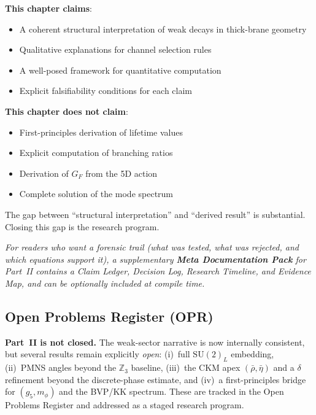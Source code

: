 \begin{tcolorbox}[readerContract, title={Final Epistemic Statement}]
\textbf{This chapter claims}:
\begin{itemize}[nosep]
  \item A coherent structural interpretation of weak decays in thick-brane geometry
  \item Qualitative explanations for channel selection rules
  \item A well-posed framework for quantitative computation
  \item Explicit falsifiability conditions for each claim
\end{itemize}

\textbf{This chapter does not claim}:
\begin{itemize}[nosep]
  \item First-principles derivation of lifetime values
  \item Explicit computation of branching ratios
  \item Derivation of $G_F$ from the 5D action
  \item Complete solution of the mode spectrum
\end{itemize}

The gap between ``structural interpretation'' and ``derived result'' is
substantial. Closing this gap is the research program.
\end{tcolorbox}

\vspace{0.5em}
\noindent\textit{For readers who want a forensic trail (what was tested, what was rejected,
and which equations support it), a supplementary \textbf{Meta Documentation Pack} for Part~II
contains a Claim Ledger, Decision Log, Research Timeline, and Evidence Map, and can be
optionally included at compile time.}

\subsection{Open Problems Register (OPR)}
\label{sec:opr}

\begin{tcolorbox}[breakable, enhanced, colback=yellow!4, colframe=yellow!60!black,
    title=\textbf{Open Status (Part II)}, width=\linewidth]
\textbf{Part~II is not closed.} The weak-sector narrative is now internally
consistent, but several results remain explicitly \emph{open}: (i)~full
$\mathrm{SU}(2)_L$ embedding, (ii)~PMNS angles beyond the $\mathbb{Z}_3$
baseline, (iii)~the CKM apex $(\bar\rho, \bar\eta)$ and a $\delta$ refinement
beyond the discrete-phase estimate, and (iv)~a first-principles bridge for
$(g_5, m_\phi)$ and the BVP/KK spectrum. These are tracked in the Open
Problems Register and addressed as a staged research program.
\end{tcolorbox}

